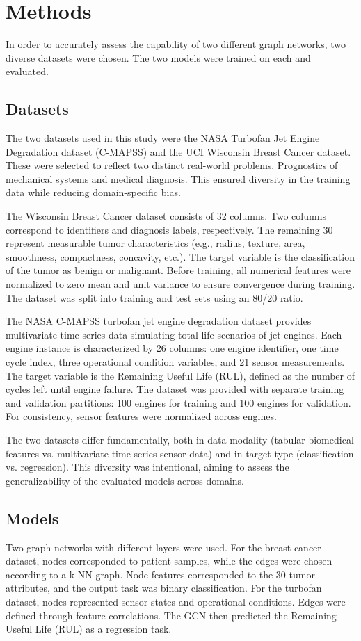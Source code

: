 \documentclass[12pt]{article}
\begin{document}
\pagebreak
\section{Methods}
In order to accurately assess the capability of two different graph networks, two diverse datasets were chosen. The two models were trained on each and evaluated.

\subsection{Datasets}
The two datasets used in this study were the NASA Turbofan Jet Engine Degradation dataset (C-MAPSS) and the UCI Wisconsin Breast Cancer dataset. These were selected to reflect two distinct real-world problems. Prognostics of mechanical systems and medical diagnosis. This ensured diversity in the training data while reducing domain-specific bias.

The Wisconsin Breast Cancer dataset consists of 32 columns. Two columns correspond to identifiers and diagnosis labels, respectively.
The remaining 30 represent measurable tumor characteristics (e.g., radius, texture, area, smoothness, compactness, concavity, etc.). The target variable is the classification of the tumor as benign or malignant. Before training, all numerical features were normalized to zero mean and unit variance to ensure convergence during training. The dataset was split into training and test sets using an 80/20 ratio.


The NASA C-MAPSS turbofan jet engine degradation dataset provides multivariate time-series data simulating total life scenarios of jet engines. Each engine instance is characterized by 26 columns: one engine identifier, one time cycle index, three operational condition variables, and 21 sensor measurements. The target variable is the Remaining Useful Life (RUL), defined as the number of cycles left until engine failure.
The dataset was provided with separate training and validation partitions: 100 engines for training and 100 engines for validation. For consistency, sensor features were normalized across engines.


The two datasets differ fundamentally, both in data modality (tabular biomedical features vs. multivariate time-series sensor data) and in target type (classification vs. regression). This diversity was intentional, aiming to assess the generalizability of the evaluated models across domains.


\subsection{Models}
Two graph networks with different layers were used.
For the breast cancer dataset, nodes corresponded to patient samples, while the edges were chosen according to a k-NN graph. Node features corresponded to the 30 tumor attributes, and the output task was binary classification.
For the turbofan dataset, nodes represented sensor states and operational conditions. Edges were defined through feature correlations. The GCN then predicted the Remaining Useful Life (RUL)
as a regression task.
\end{document}
